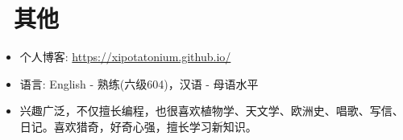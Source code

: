 \documentclass{resume}
\begin{document}

\section{\faInfo\ 其他}
\begin{itemize}[parsep=0.25ex]
  \item 个人博客: \url{https://xipotatonium.github.io/}
  \item 语言: English - 熟练(六级604)，汉语 - 母语水平
  \item 兴趣广泛，不仅擅长编程，也很喜欢植物学、天文学、欧洲史、唱歌、写信、日记。喜欢猎奇，好奇心强，擅长学习新知识。
\end{itemize}
\end{document}
